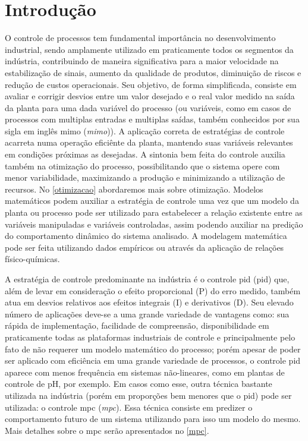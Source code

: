 \chapter{Introdução}

O controle de processos tem fundamental importância no desenvolvimento industrial, sendo amplamente utilizado em praticamente todos os segmentos da indústria, contribuindo de maneira significativa para a maior velocidade na estabilização de sinais, aumento da qualidade de produtos, diminuição de riscos e redução de custos operacionais. Seu objetivo, de forma simplificada, consiste em avaliar e corrigir desvios entre um valor desejado e o real valor medido na saída da planta para uma dada variável do processo (ou variáveis, como em casos de processos com multiplas entradas e multiplas saídas, também conhecidos por sua sigla em inglês \acrshort{mimo} (\textit{\acrlong{mimo}})). A aplicação correta de estratégias de controle acarreta numa operação eficiênte da planta, mantendo suas variáveis relevantes em condições próximas as desejadas. A sintonia bem feita do controle auxilia também na otimização do processo, possibilitando que o sistema opere com menor variabilidade, maximizando a produção e minimizando a utilização de recursos. No \autoref{otimizacao} abordaremos mais sobre otimização.
Modelos matemáticos podem auxiliar a estratégia de controle uma vez que um modelo da planta ou processo pode ser utilizado para estabelecer a relação existente entre as variáveis manipuladas e variáveis controladas, assim podendo auxiliar na predição do comportamento dinâmico do sistema analisado. A modelagem matemática pode ser feita utilizando dados empíricos ou através da aplicação de relações físico-químicas.

A estratégia de controle predominante na indústria é o controle \acrshort{pid} (\acrlong{pid}) que, além de levar em consideração o efeito proporcional (P) do erro medido, também atua em desvios relativos aos efeitos integrais (I) e derivativos (D). Seu elevado número de aplicações deve-se a uma grande variedade de vantagens como: sua rápida de implementação, facilidade de compreensão, disponibilidade em praticamente todas as plataformas industriais de controle e principalmente pelo fato de não requerer um modelo matemático do processo; porém apesar de poder ser aplicado com eficiência em uma grande variedade de processos, o controle \acrshort{pid} aparece com menos frequência em sistemas não-lineares, como em plantas de controle de pH, por exemplo. Em casos como esse, outra técnica bastante utilizada na indústria (porém em proporções bem menores que o \acrshort{pid}) pode ser utilizada: o controle \acrshort{mpc} (\textit{\acrlong{mpc}}). Essa técnica consiste em predizer o comportamento futuro de um sistema utilizando para isso um modelo do mesmo. Mais detalhes sobre o \acrshort{mpc} serão apresentados no \autoref{mpc}.

